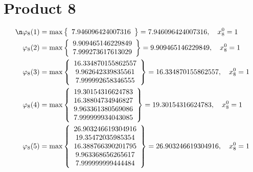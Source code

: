 \documentclass{article}
\begin{document}
\section{Product 8}
\begin{align*}
\n  
  
\varphi_{8}(1) &= \max \left\{ \begin{array}{c}
7.946096424007316
\end{array} \right\} = 7.946096424007316, \quad x_{8}^0 = 1\\
  
  
  
  
\varphi_{8}(2) &= \max \left\{ \begin{array}{c}
9.909465146229849 \\
 7.999273617613029
\end{array} \right\} = 9.909465146229849, \quad x_{8}^0 = 1\\
  
  
  
  
\varphi_{8}(3) &= \max \left\{ \begin{array}{c}
16.334870155862557 \\
 9.962642339835561 \\
 7.999992658346555
\end{array} \right\} = 16.334870155862557, \quad x_{8}^0 = 1\\
  
  
  
  
\varphi_{8}(4) &= \max \left\{ \begin{array}{c}
19.30154316624783 \\
 16.38804734946827 \\
 9.963361380569086 \\
 7.999999934043085
\end{array} \right\} = 19.30154316624783, \quad x_{8}^0 = 1\\
  
  
  
  
\varphi_{8}(5) &= \max \left\{ \begin{array}{c}
26.903246619304916 \\
 19.35472035985354 \\
 16.388766390201795 \\
 9.963368656265617 \\
 7.999999999444484
\end{array} \right\} = 26.903246619304916, \quad x_{8}^0 = 1\\
  
  
  

\end{align*}
\end{document}
